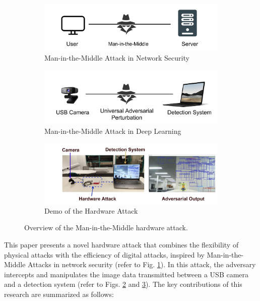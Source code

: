 \begin{figure}[tpb]
    \centering
    \begin{subfigure}[b]{0.6\linewidth}
        \includegraphics[width=1\linewidth]{figures/chapter_detection/mitm.png}
        \caption{Man-in-the-Middle Attack in Network Security}
        \label{fig:mitm} 
    \end{subfigure}

    \begin{subfigure}[b]{0.6\linewidth}
        \includegraphics[width=1\linewidth]{figures/chapter_detection/overview.png}
        \caption{Man-in-the-Middle Attack in Deep Learning}
        \label{fig:minm}
    \end{subfigure}

    \begin{subfigure}[b]{0.6\linewidth}
        \includegraphics[width=1\linewidth]{figures/chapter_detection/demo.jpg}
        \caption{Demo of the Hardware Attack}
        \label{fig:demo}
    \end{subfigure}

  \caption{Overview of the Man-in-the-Middle hardware attack.}
  \label{fig:overview}
\end{figure}

This paper presents a novel hardware attack that combines the flexibility of physical attacks with the efficiency of digital attacks, inspired by Man-in-the-Middle Attacks in network security (refer to Fig. \ref{fig:mitm}). In this attack, the adversary intercepts and manipulates the image data transmitted between a USB camera and a detection system (refer to Figs. \ref{fig:minm} and \ref{fig:demo}). The key contributions of this research are summarized as follows:

